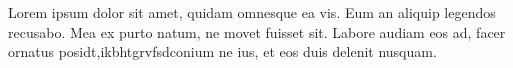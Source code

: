 Lorem ipsum dolor sit amet, quidam omnesque ea vis. Eum an aliquip legendos recusabo. Mea ex purto natum, ne movet fuisset sit. Labore audiam eos ad, facer ornatus posidt,ikbhtgrvfsdconium ne ius, et eos duis delenit nusquam.